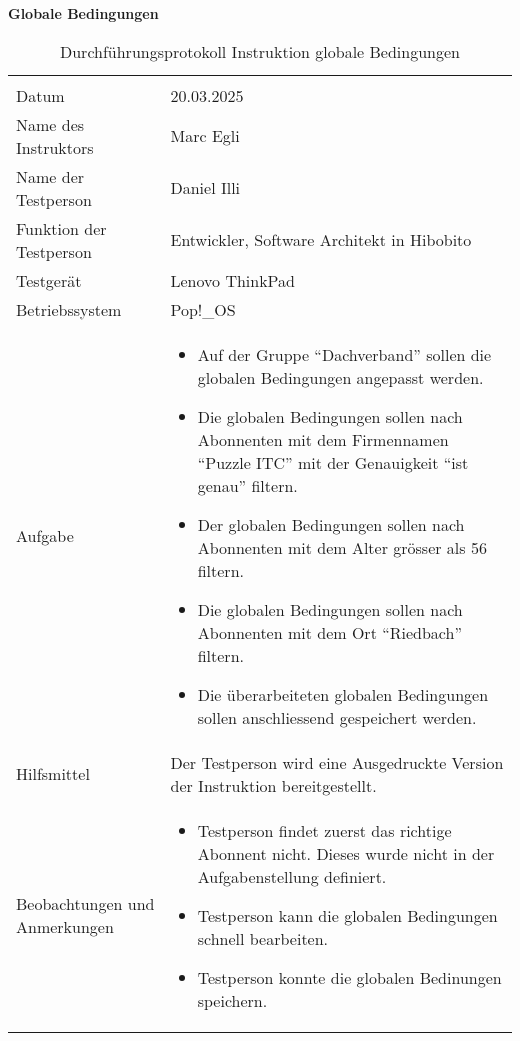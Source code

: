 \textbf{Globale Bedingungen}
\begin{table}[h!]
   \begin{tabular}{|L{0.4\textwidth}|L{0.6\textwidth}|}
       \hline
        \\
       Datum & 20.03.2025 \\
       \hline
       Name des Instruktors & Marc Egli \\
       \hline
       Name der Testperson & Daniel Illi \\
       \hline
       Funktion der Testperson & Entwickler, Software Architekt in Hibobito \\
       \hline
       Testgerät & Lenovo ThinkPad \\
       \hline
       Betriebssystem & Pop!\_OS \\
       \hline
       Aufgabe & 
       \begin{itemize}
         \item Auf der Gruppe ``Dachverband'' sollen die globalen Bedingungen angepasst werden.
         \item Die globalen Bedingungen sollen nach Abonnenten mit dem Firmennamen ``Puzzle ITC'' mit der Genauigkeit ``ist genau'' filtern.
         \item Der globalen Bedingungen sollen nach Abonnenten mit dem Alter grösser als 56 filtern.
         \item Die globalen Bedingungen sollen nach Abonnenten mit dem Ort ``Riedbach'' filtern.
         \item Die überarbeiteten globalen Bedingungen sollen anschliessend gespeichert werden.
       \end{itemize} \\
       \hline
       Hilfsmittel & Der Testperson wird eine Ausgedruckte Version der Instruktion bereitgestellt. \\
       \hline
       Beobachtungen und Anmerkungen & 
       \begin{itemize}
         \item Testperson findet zuerst das richtige Abonnent nicht. Dieses wurde nicht in der Aufgabenstellung definiert.
         \item Testperson kann die globalen Bedingungen schnell bearbeiten.
         \item Testperson konnte die globalen Bedinungen speichern.
       \end{itemize}   \\
       \hline
     \end{tabular}
     \caption{Durchführungsprotokoll Instruktion globale Bedingungen}
\end{table}

